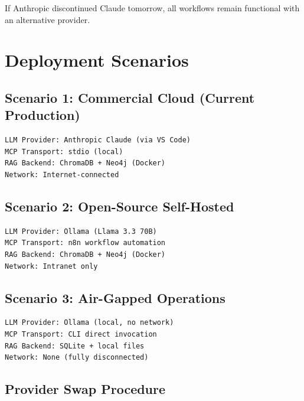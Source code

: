 \documentclass[11pt,twocolumn]{article}
\begin{document}
If Anthropic discontinued Claude tomorrow, all workflows remain functional with an alternative provider.

\section{Deployment Scenarios}

\subsection{Scenario 1: Commercial Cloud (Current Production)}

\begin{lstlisting}[caption=Commercial Deployment Configuration]
LLM Provider: Anthropic Claude (via VS Code)
MCP Transport: stdio (local)
RAG Backend: ChromaDB + Neo4j (Docker)
Network: Internet-connected
\end{lstlisting}

\subsection{Scenario 2: Open-Source Self-Hosted}

\begin{lstlisting}[caption=Self-Hosted Deployment Configuration]
LLM Provider: Ollama (Llama 3.3 70B)
MCP Transport: n8n workflow automation
RAG Backend: ChromaDB + Neo4j (Docker)
Network: Intranet only
\end{lstlisting}

\subsection{Scenario 3: Air-Gapped Operations}

\begin{lstlisting}[caption=Air-Gapped Deployment Configuration]
LLM Provider: Ollama (local, no network)
MCP Transport: CLI direct invocation
RAG Backend: SQLite + local files
Network: None (fully disconnected)
\end{lstlisting}

\subsection{Provider Swap Procedure}
\end{document}
